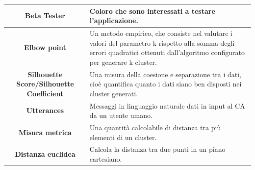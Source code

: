 \documentclass[a4paper, 10pt]{report}
\begin{document}
\begin{adjustbox}{width=\columnwidth,center}
\begin{tabular}{|>{\columncolor{Goldenrod}}c|p{8cm}|}
                \hline \textbf{Beta Tester} & Coloro che sono interessati a testare l'applicazione.\\
                \hline \textbf{Elbow point} & Un metodo empirico, che consiste nel valutare i valori del parametro k
                        rispetto alla somma degli errori quadratici ottenuti dall’algoritmo
                        configurato per generare k cluster.\\
                \hline \textbf{Silhouette Score/Silhouette Coefficient} & Una misura della coesione e separazione tra i dati, cioè
                        quantifica quanto i dati siano ben disposti nei cluster generati.\\
                \hline \textbf{Utterances} & Messaggi in linguaggio naturale dati in input al CA da un utente umano.\\
                \hline \textbf{Misura metrica} & Una quantità calcolabile di distanza tra più elementi di un cluster.\\
                \hline \textbf{Distanza euclidea} & Calcola la distanza tra due punti in un piano cartesiano.\\
                \hline
            \end{tabular}
        \end{adjustbox}
\end{document}
